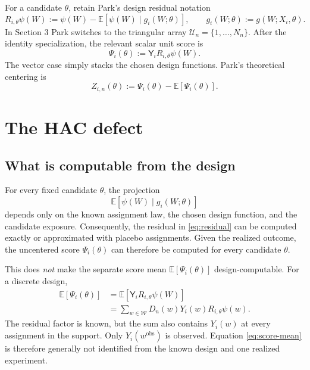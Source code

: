 \documentclass[11pt]{article}
\newcommand{\E}{\mathbb E}
\newcommand{\obs}{\mathrm{obs}}
\begin{document}
For a candidate \(\theta\), retain Park's design residual notation
\begin{equation}
 R_{i,\theta}\psi(W)
 :=\psi(W)-\E[\psi(W)\mid g_i(W;\theta)],
 \qquad
 g_i(W;\theta):=g(W;X_i,\theta).
 \label{eq:residual}
\end{equation}
In Section 3 Park switches to the triangular array
\(\mathcal U_n=\{1,\ldots,N_n\}\). After the identity specialization, the
relevant scalar unit score is
\begin{equation}
 \Psi_i(\theta):=\mathsf{Y}_iR_{i,\theta}\psi(W).
 \label{eq:score}
\end{equation}
The vector case simply stacks the chosen design functions. Park's theoretical
centering is
\begin{equation}
 Z_{i,n}(\theta)
 :=\Psi_i(\theta)-\E[\Psi_i(\theta)].
 \label{eq:centered-score}
\end{equation}

\section{The HAC defect}

\subsection{What is computable from the design}

For every fixed candidate \(\theta\), the projection
\[
 \E[\psi(W)\mid g_i(W;\theta)]
\]
depends only on the known assignment law, the chosen design function, and the
candidate exposure. Consequently, the residual in \eqref{eq:residual} can be
computed exactly or approximated with placebo assignments. Given the realized
outcome, the uncentered score \(\Psi_i(\theta)\) can therefore be computed for
every candidate \(\theta\).

This does \emph{not} make the separate score mean
\(\E[\Psi_i(\theta)]\) design-computable. For a discrete design,
\begin{align}
 \E[\Psi_i(\theta)]
 &=\E[\mathsf{Y}_iR_{i,\theta}\psi(W)] \\
 &=\sum_{w\in\mathcal W}
   D_n(w)Y_i(w)R_{i,\theta}\psi(w).
 \label{eq:score-mean}
\end{align}
The residual factor is known, but the sum also contains \(Y_i(w)\) at every
assignment in the support. Only \(Y_i(w^{\obs})\) is observed. Equation
\eqref{eq:score-mean} is therefore generally not identified from the known
design and one realized experiment.
\end{document}
